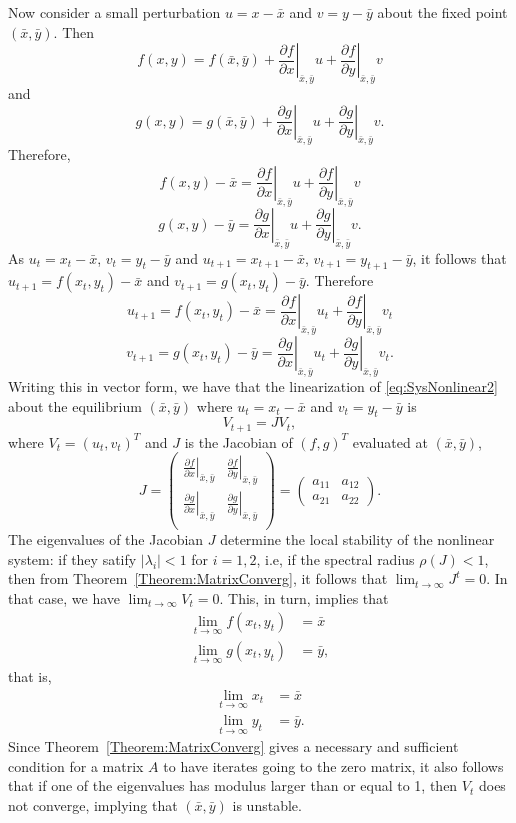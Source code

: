 Now consider a small perturbation $u=x-\bar x$ and $v=y-\bar y$ about the fixed point $(\bar x,\bar y)$. Then 
$$f(x,y)= f(\bar x,\bar y)+\left .\frac{\partial f}{\partial x}\right |_{\bar x,\bar y}u+ \left .\frac{\partial f}{\partial y}\right |_{\bar x,\bar y}v$$
and 
$$g(x,y)= g(\bar x,\bar y)+\left .\frac{\partial g}{\partial x}\right |_{\bar x,\bar y}u+ \left .\frac{\partial g}{\partial y}\right |_{\bar x,\bar y}v.$$
Therefore,
$$f(x,y)- \bar x=\left .\frac{\partial f}{\partial x}\right |_{\bar x,\bar y}u+ \left .\frac{\partial f}{\partial y}\right |_{\bar x,\bar y}v$$
$$g(x,y)-\bar y=\left .\frac{\partial g}{\partial x}\right |_{\bar x,\bar y}u+ \left .\frac{\partial g}{\partial y}\right |_{\bar x,\bar y}v.$$
As $u_t=x_t-\bar x$, $v_t=y_t-\bar y$ and $u_{t+1}=x_{t+1}-\bar x$, $v_{t+1}=y_{t+1}-\bar y$, it follows that $u_{t+1}=f(x_t,y_t)-\bar x$ and $v_{t+1}=g(x_t, y_t)-\bar y$. Therefore
$$u_{t+1}=f(x_t,y_t)- \bar x=\left .\frac{\partial f}{\partial x}\right |_{\bar x,\bar y}u_t+ \left .\frac{\partial f}{\partial y}\right |_{\bar x,\bar y}v_t$$
$$v_{t+1}=g( x_t, y_t)-\bar y=\left .\frac{\partial g}{\partial x}\right |_{\bar x,\bar y}u_t+ \left .\frac{\partial g}{\partial y}\right |_{\bar x,\bar y}v_t.$$
Writing this in vector form, we have that the linearization of \eqref{eq:SysNonlinear2} about the equilibrium $(\bar x, \bar y)$ where $u_t=x_t-\bar x$ and  $v_t=y_t-\bar y$ is
$$V_{t+1}=JV_t,$$
where $V_{t}=(u_t,v_t)^T$ and $J$ is the Jacobian of $(f,g)^T$ evaluated at $(\bar x, \bar y)$,
$$
J=\left ( 
\begin{array}{cc}
\left . \frac{\partial f}{\partial x}\right |_{\bar x,\bar y} & \left .\frac{\partial f}{\partial y}\right |_{\bar x,\bar y}\\
\left .\frac{\partial g}{\partial x}\right |_{\bar x,\bar y} & \left .\frac{\partial g}{\partial y}\right |_{\bar x,\bar y}\\
\end{array}
\right )
=
\left ( 
\begin{array}{cc}
a_{11} & a_{12} \\
a_{21} & a_{22}
\end{array}
\right ).
$$
The eigenvalues of the Jacobian $J$ determine the local stability of the nonlinear system: if they satify $|\lambda _i|<1$ for $i=1,2$, i.e, if the spectral radius $\rho (J)<1$, then from Theorem~\ref{Theorem:MatrixConverg}, it follows that $\lim _{t\rightarrow \infty} J^t=0$. In that case, we have $\lim_{t\to\infty}V_t=0$. This, in turn, implies that
\begin{align*}
\lim_{t\to\infty}f(x_t,y_t) &= \bar x\\
\lim_{t\to\infty}g(x_t,y_t) &= \bar y, 
\end{align*}
that is, 
\begin{align*}
\lim_{t\to\infty}x_t &= \bar x\\
\lim_{t\to\infty}y_t &= \bar y.
\end{align*}
Since Theorem~\ref{Theorem:MatrixConverg} gives a necessary and sufficient condition for a matrix $A$ to have iterates going to the zero matrix, it also follows that if one of the eigenvalues has modulus larger than or equal to 1, then $V_t$ does not converge, implying that $(\bar x,\bar y)$ is unstable.




